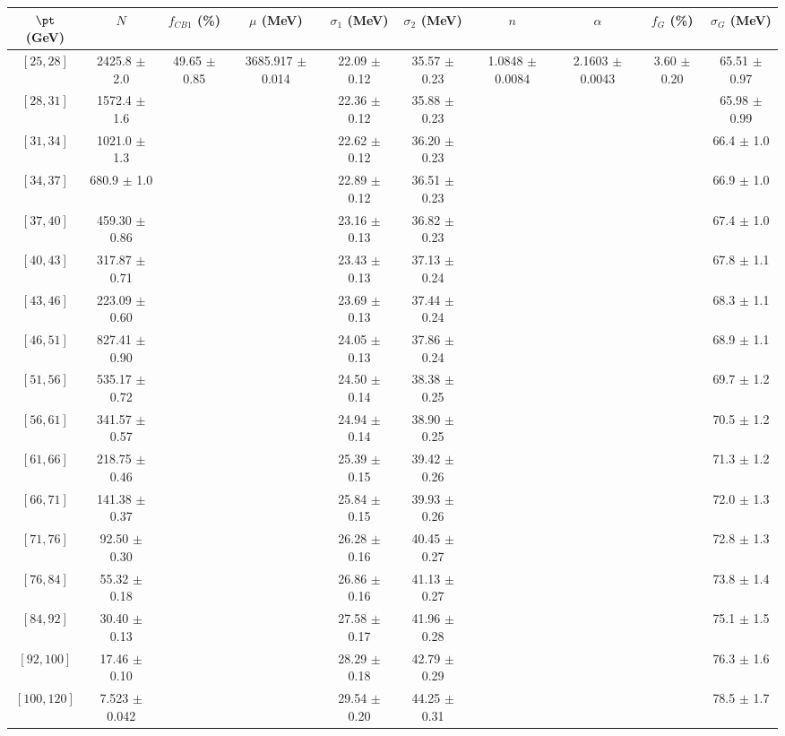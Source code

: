 \begin{tabular}{c||c|c|c|c|c|c|c|c|c}
$\pt$ (GeV) & $N$ & $f_{CB1}$ (\%)  & $\mu$ (MeV) & $\sigma_1$ (MeV) & $\sigma_2$ (MeV) & $n$ & $\alpha$ & $f_G$ (\%) & $\sigma_G$ (MeV) \\
\hline
$[25, 28]$ & 2425.8 $\pm$ 2.0 & \multirow{17}{*}{49.65 $\pm$ 0.85} & \multirow{17}{*}{3685.917 $\pm$ 0.014} & 22.09 $\pm$ 0.12 & 35.57 $\pm$ 0.23 & \multirow{17}{*}{1.0848 $\pm$ 0.0084} & \multirow{17}{*}{2.1603 $\pm$ 0.0043} & \multirow{17}{*}{3.60 $\pm$ 0.20} & 65.51 $\pm$ 0.97\\
$[28, 31]$ & 1572.4 $\pm$ 1.6 &  &  & 22.36 $\pm$ 0.12 & 35.88 $\pm$ 0.23 &  &  &  & 65.98 $\pm$ 0.99\\
$[31, 34]$ & 1021.0 $\pm$ 1.3 &  &  & 22.62 $\pm$ 0.12 & 36.20 $\pm$ 0.23 &  &  &  & 66.4 $\pm$ 1.0\\
$[34, 37]$ & 680.9 $\pm$ 1.0 &  &  & 22.89 $\pm$ 0.12 & 36.51 $\pm$ 0.23 &  &  &  & 66.9 $\pm$ 1.0\\
$[37, 40]$ & 459.30 $\pm$ 0.86 &  &  & 23.16 $\pm$ 0.13 & 36.82 $\pm$ 0.23 &  &  &  & 67.4 $\pm$ 1.0\\
$[40, 43]$ & 317.87 $\pm$ 0.71 &  &  & 23.43 $\pm$ 0.13 & 37.13 $\pm$ 0.24 &  &  &  & 67.8 $\pm$ 1.1\\
$[43, 46]$ & 223.09 $\pm$ 0.60 &  &  & 23.69 $\pm$ 0.13 & 37.44 $\pm$ 0.24 &  &  &  & 68.3 $\pm$ 1.1\\
$[46, 51]$ & 827.41 $\pm$ 0.90 &  &  & 24.05 $\pm$ 0.13 & 37.86 $\pm$ 0.24 &  &  &  & 68.9 $\pm$ 1.1\\
$[51, 56]$ & 535.17 $\pm$ 0.72 &  &  & 24.50 $\pm$ 0.14 & 38.38 $\pm$ 0.25 &  &  &  & 69.7 $\pm$ 1.2\\
$[56, 61]$ & 341.57 $\pm$ 0.57 &  &  & 24.94 $\pm$ 0.14 & 38.90 $\pm$ 0.25 &  &  &  & 70.5 $\pm$ 1.2\\
$[61, 66]$ & 218.75 $\pm$ 0.46 &  &  & 25.39 $\pm$ 0.15 & 39.42 $\pm$ 0.26 &  &  &  & 71.3 $\pm$ 1.2\\
$[66, 71]$ & 141.38 $\pm$ 0.37 &  &  & 25.84 $\pm$ 0.15 & 39.93 $\pm$ 0.26 &  &  &  & 72.0 $\pm$ 1.3\\
$[71, 76]$ & 92.50 $\pm$ 0.30 &  &  & 26.28 $\pm$ 0.16 & 40.45 $\pm$ 0.27 &  &  &  & 72.8 $\pm$ 1.3\\
$[76, 84]$ & 55.32 $\pm$ 0.18 &  &  & 26.86 $\pm$ 0.16 & 41.13 $\pm$ 0.27 &  &  &  & 73.8 $\pm$ 1.4\\
$[84, 92]$ & 30.40 $\pm$ 0.13 &  &  & 27.58 $\pm$ 0.17 & 41.96 $\pm$ 0.28 &  &  &  & 75.1 $\pm$ 1.5\\
$[92, 100]$ & 17.46 $\pm$ 0.10 &  &  & 28.29 $\pm$ 0.18 & 42.79 $\pm$ 0.29 &  &  &  & 76.3 $\pm$ 1.6\\
$[100, 120]$ & 7.523 $\pm$ 0.042 &  &  & 29.54 $\pm$ 0.20 & 44.25 $\pm$ 0.31 &  &  &  & 78.5 $\pm$ 1.7\\
\end{tabular}
